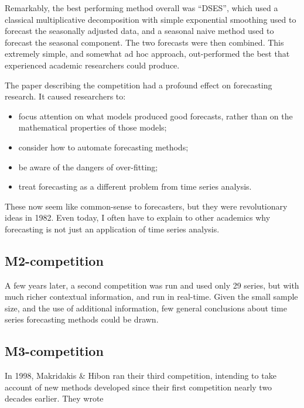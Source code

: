 \documentclass[11pt,a4paper,]{article}
\providecommand{\tightlist}{%
  \setlength{\itemsep}{0pt}\setlength{\parskip}{0pt}}
\begin{document}
Remarkably, the best performing method overall was ``DSES'', which used a classical multiplicative decomposition \autocite{fpp2} with simple exponential smoothing used to forecast the seasonally adjusted data, and a seasonal naive method used to forecast the seasonal component. The two forecasts were then combined. This extremely simple, and somewhat ad hoc approach, out-performed the best that experienced academic researchers could produce.

The paper describing the competition \autocite{M1} had a profound effect on forecasting research. It caused researchers to:

\begin{itemize}
\tightlist
\item
  focus attention on what models produced good forecasts, rather than on the mathematical properties of those models;
\item
  consider how to automate forecasting methods;
\item
  be aware of the dangers of over-fitting;
\item
  treat forecasting as a different problem from time series analysis.
\end{itemize}

These now seem like common-sense to forecasters, but they were revolutionary ideas in 1982. Even today, I often have to explain to other academics why forecasting is not just an application of time series analysis.

\hypertarget{m2-competition}{%
\subsection*{M2-competition}\label{m2-competition}}

A few years later, a second competition was run \autocite{M2} and used only 29 series, but with much richer contextual information, and run in real-time. Given the small sample size, and the use of additional information, few general conclusions about time series forecasting methods could be drawn.

\hypertarget{m3-competition}{%
\subsection*{M3-competition}\label{m3-competition}}

In 1998, Makridakis \& Hibon ran their third competition, intending to take account of new methods developed since their first competition nearly two decades earlier. They wrote
\end{document}

